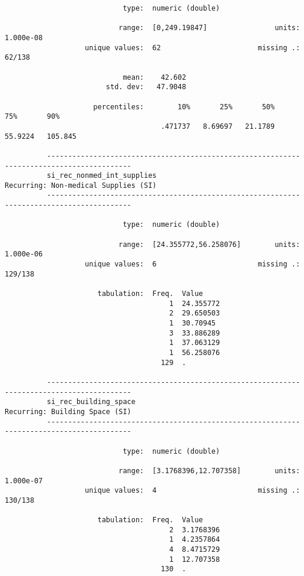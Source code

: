 \documentclass{article}
\begin{document}
\begin{verbatim}
                            type:  numeric (double)
          
                           range:  [0,249.19847]                units:  1.000e-08
                   unique values:  62                       missing .:  62/138
          
                            mean:    42.602
                        std. dev:   47.9048
          
                     percentiles:        10%       25%       50%       75%       90%
                                     .471737   8.69697   21.1789   55.9224   105.845
          
          ------------------------------------------------------------------------------------------
          si_rec_nonmed_int_supplies                            Recurring: Non-medical Supplies (SI)
          ------------------------------------------------------------------------------------------
          
                            type:  numeric (double)
          
                           range:  [24.355772,56.258076]        units:  1.000e-06
                   unique values:  6                        missing .:  129/138
          
                      tabulation:  Freq.  Value
                                       1  24.355772
                                       2  29.650503
                                       1  30.70945
                                       3  33.886289
                                       1  37.063129
                                       1  56.258076
                                     129  .
          
          ------------------------------------------------------------------------------------------
          si_rec_building_space                                       Recurring: Building Space (SI)
          ------------------------------------------------------------------------------------------
          
                            type:  numeric (double)
          
                           range:  [3.1768396,12.707358]        units:  1.000e-07
                   unique values:  4                        missing .:  130/138
          
                      tabulation:  Freq.  Value
                                       2  3.1768396
                                       1  4.2357864
                                       4  8.4715729
                                       1  12.707358
                                     130  .
          

\end{verbatim}
\end{document}

